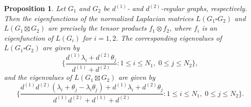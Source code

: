\documentclass{article}
\theoremstyle{plain}
\newtheorem{proposition}[theorem]{Proposition}
\theoremstyle{definition}
\theoremstyle{remark}
\begin{document}
\begin{proposition}\label{prop:Cartstrongeigen}
    Let $G_1$ and $G_2$ be $d^{(1)}$- and $d^{(2)}$-regular graphs, respectively. Then the eigenfunctions of the normalized Laplacian matrices $L(G_1\square G_2)$ and $L(G_1\boxtimes G_2)$ are precisely the tensor products $f_1\otimes f_2$, where $f_i$ is an eigenfunction of $L(G_i)$ for $i=1,2$. The corresponding eigenvalues of $L(G_1 \square G_2)$ are given by
\begin{equation*}
\biggl\{ \frac{d^{(1)}\lambda_i + d^{(2)} \theta_j}{d^{(1)}+d^{(2)}} \colon 1\leq i\leq N_1,\; 0 \leq j \leq N_2 \biggr\},
\end{equation*}
and the eigenvalues of $L(G_1\boxtimes G_2)$ are given by
\begin{equation*}
    \biggl\{ \frac{d^{(1)} d^{(2)}(\lambda_i+\theta_j - \lambda_i\theta_j) + d^{(1)}\lambda_i + d^{(2)}\theta_j}{d^{(1)}d^{(2)}+d^{(1)}+d^{(2)}}\colon 1\leq i\leq N_1,\; 0 \leq j \leq N_2 \biggr\}.
\end{equation*}
\end{proposition}
\end{document}
